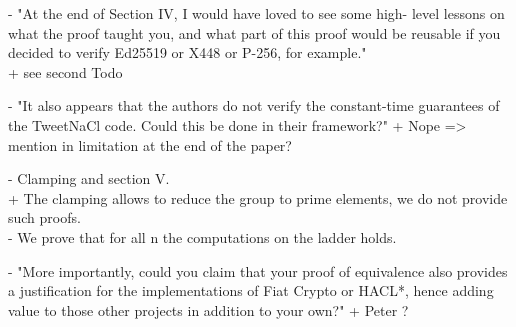 {- "At the end of Section IV, I would have loved to see some high-
level lessons on what the proof taught you, and what part of this
proof would be reusable if you decided to verify Ed25519 or X448
or P-256, for example."\\
+ see second Todo

- "It also appears that the authors do not verify the constant-time
guarantees of the TweetNaCl code. Could this be done in their
framework?"
+ Nope => mention in limitation at the end of the paper?

- Clamping and section V.\\
+ The clamping allows to reduce the group to prime elements, we do not provide
such proofs.\\
- We prove that for all n the computations on the ladder holds.

- "More importantly, could you claim that your proof of equivalence also provides
a justification for the implementations of Fiat Crypto or HACL*, hence adding
value to those other projects in addition to your own?"
+ Peter ?
}
